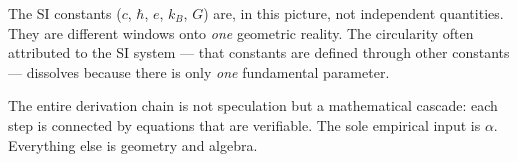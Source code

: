 The SI constants ($c$, $\hbar$, $e$, $k_B$, $G$) are, in this picture, not independent quantities. They are different windows onto \emph{one} geometric reality. The circularity often attributed to the SI system --- that constants are defined through other constants --- dissolves because there is only \emph{one} fundamental parameter.

\begin{kerngedanke}
The entire derivation chain is not speculation but a mathematical cascade: each step is connected by equations that are verifiable. The sole empirical input is $\alpha$. Everything else is geometry and algebra.
\end{kerngedanke}
